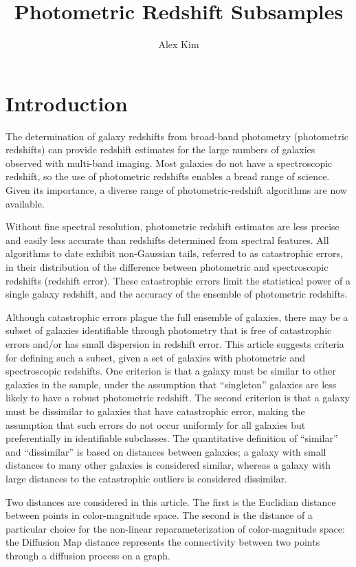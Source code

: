 \documentclass[preprint]{aastex}
\begin{document}
\title{Photometric Redshift Subsamples}
\author{Alex Kim}

\section{Introduction}

The determination of galaxy redshifts from broad-band photometry (photometric redshifts) can provide redshift estimates
for the large numbers of galaxies observed with multi-band imaging.  Most  galaxies do not have a
spectroscopic redshift, so the use of photometric redshifts enables a bread range of science.  
Given its importance, a diverse range of photometric-redshift algorithms are now available.

Without fine spectral resolution, photometric redshift estimates are less precise and easily less accurate than redshifts
determined from spectral features.  All algorithms to date exhibit non-Gaussian tails, referred to as catastrophic errors,
in their distribution of the difference between photometric and spectroscopic redshifts (redshift error).
These catastrophic errors limit
the statistical power of a single galaxy redshift, and the accuracy of the ensemble of photometric redshifts.

Although catastrophic errors plague the full ensemble of galaxies, there may be a subset of  galaxies identifiable through
photometry that is free of catastrophic errors and/or has small dispersion in redshift error.  This article suggests
criteria for defining such a subset, given a set of galaxies with
photometric and spectroscopic redshifts.  One criterion is that a galaxy must be similar to other galaxies in the sample,
under the assumption that ``singleton'' galaxies are less likely to have a robust photometric redshift.
The second criterion is that a galaxy must be dissimilar to galaxies that have catastrophic error, making the assumption
that such errors do not occur uniformly for all galaxies but preferentially in identifiable subclasses.
The quantitative definition of ``similar'' and ``dissimilar'' is based on distances between galaxies; a galaxy with small
distances to many other galaxies is considered similar, whereas a galaxy with large distances to the catastrophic outliers
is considered dissimilar.

Two distances are considered in this article.  The first is the Euclidian distance between points in color-magnitude
space.  The second is the distance of a particular choice for the non-linear reparameterization of color-magnitude space:
the Diffusion Map distance represents the connectivity between two points through a diffusion process on a graph.
\end{document}
